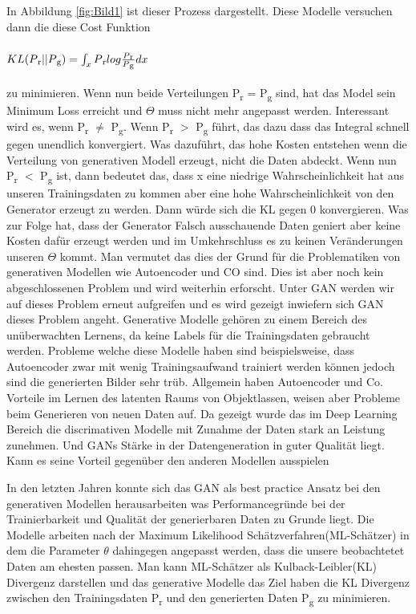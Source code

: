 \documentclass{llncs}
\begin{document}
In Abbildung \ref{fig:Bild1} ist dieser Prozess dargestellt. Diese Modelle versuchen dann die diese Cost Funktion  
\\
\\
\begin{math}
KL(P\textsubscript{r}||P\textsubscript{g})=\int_x P\textsubscript{r}log\frac{P\textsubscript{r}}{P\textsubscript{g}}dx                     
\end{math}
\\
\\
zu minimieren. Wenn nun beide Verteilungen P\textsubscript{r} = P\textsubscript{g} sind, hat das Model sein Minimum Loss erreicht und $\Theta$ muss nicht mehr angepasst werden. Interessant wird es, wenn P\textsubscript{r} $\ne$ P\textsubscript{g}.
Wenn  P\textsubscript{r} $>$ P\textsubscript{g} führt, das dazu dass das Integral schnell gegen unendlich konvergiert. Was dazuführt, das hohe Kosten entstehen wenn die  Verteilung von generativen Modell erzeugt, nicht die Daten abdeckt. Wenn nun  P\textsubscript{r} $<$ P\textsubscript{g} ist, dann bedeutet das, dass x eine niedrige Wahrscheinlichkeit hat aus unseren Trainingsdaten zu kommen aber eine hohe Wahrscheinlichkeit von den Generator erzeugt zu werden. Dann würde sich die KL gegen 0 konvergieren. Was zur Folge hat, dass der Generator Falsch ausschauende Daten geniert aber keine Kosten dafür erzeugt werden und im Umkehrschluss es zu keinen Veränderungen unseren $\Theta$ kommt. Man vermutet das dies der Grund für die Problematiken von generativen Modellen wie Autoencoder und CO sind. Dies ist aber noch kein abgeschlossenen Problem und wird weiterhin erforscht\cite{improvingan}.
Unter GAN werden wir auf dieses Problem erneut aufgreifen und es wird gezeigt inwiefern sich GAN dieses Problem angeht. Generative Modelle gehören zu einem Bereich des unüberwachten Lernens, da keine Labels für die Trainingsdaten gebraucht werden. Probleme welche diese Modelle haben sind beispielsweise, dass Autoencoder zwar mit wenig Trainingsaufwand trainiert werden können jedoch sind die generierten Bilder sehr trüb. Allgemein haben Autoencoder und Co. Vorteile  im Lernen des latenten Raums von Objektlassen, weisen aber Probleme beim Generieren von neuen Daten auf. Da gezeigt wurde das im Deep Learning Bereich die discrimativen Modelle mit Zunahme der Daten stark an Leistung zunehmen. Und GANs Stärke in der Datengeneration in guter Qualität liegt. Kann es seine Vorteil gegenüber den anderen Modellen ausspielen\cite{improving}


In den letzten Jahren konnte sich das GAN als best practice Ansatz bei den generativen Modellen herausarbeiten was Performancegründe bei der Trainierbarkeit und Qualität der generierbaren Daten zu Grunde liegt\cite{Grundlagen}. 
Die Modelle arbeiten nach der Maximum Likelihood Schätzverfahren(ML-Schätzer) in dem die Parameter $\theta$ dahingegen angepasst werden, dass die unsere beobachtetet Daten am ehesten passen. Man kann ML-Schätzer als Kulback-Leibler(KL) Divergenz darstellen und das generative Modelle das Ziel haben die KL Divergenz zwischen den Trainingsdaten P\textsubscript{r} und den generierten Daten P\textsubscript{g} zu minimieren.
\end{document}
